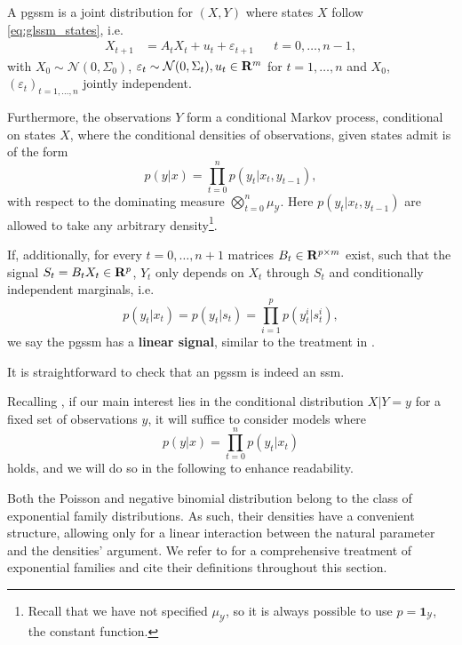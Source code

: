 \begin{definition}
    A \acrfull{pgssm} is a joint distribution for $(X,Y)$ where states $X$ follow \eqref{eq:glssm_states}, i.e. 
    \begin{align*}
        X_{t + 1}  &= A_{t}X_{t} + u_{t} + \varepsilon_{t + 1} &  & t = 0, \dots, n - 1,
    \end{align*}
    with $X_{0} \sim \mathcal N(0, \Sigma_{0})$, $\varepsilon_{t} \sim \mathcal N (0, \Sigma_{t}), u_{t} \in \mathbf R^{m}$ for $t = 1, \dots, n$ and $X_{0}$, $(\varepsilon_{t})_{t = 1, \dots, n}$ jointly independent. 

    Furthermore, the observations $Y$ form a conditional Markov process, conditional on states $X$, where the conditional densities of observations, given states admit is of the form
    $$
    p(y | x) = \prod_{t = 0}^n p(y_{t} | x_{t}, y_{t - 1}),
    $$
    with respect to the dominating measure $\bigotimes_{t = 0}^n\mu_{\mathcal Y}$.
    Here $p(y_{t} | x_{t}, y_{t -1})$ are allowed to take any arbitrary density\footnote{Recall that we have not specified $\mu_{\mathcal Y}$, so it is always possible to use $p = \mathbf 1 _{\mathcal Y}$, the constant function.}.

    If, additionally, for every $t=0, \dots, n+1$ matrices $B_{t} \in \mathbf R^{p \times m}$ exist, such that the signal $S_{t} = B_{t}X_{t} \in \mathbf R^{p}$, $Y_{t}$ only depends on $X_{t}$ through $S_{t}$ and conditionally independent marginals, i.e. 
    $$
        p(y_{t}|x_{t}) = p(y_{t}|s_{t}) = \prod_{i = 1}^p p(y_{t}^i|s_{t}^i),
    $$
    we say the \gls{pgssm} has a \textbf{linear signal}, similar to the treatment in \citep[Part II]{Durbin2012Time}.
\end{definition}

It is straightforward to check that an \gls{pgssm} is indeed an \gls{ssm}. 

\begin{remark}
    Recalling , if our main interest lies in the conditional distribution $X|Y = y$ for a fixed set of observations $y$, it will suffice to consider models where 
    $$
    p(y | x) = \prod_{t = 0}^n p(y_{t} | x_{t})
    $$
    holds, and we will do so in the following to enhance readability.
\end{remark}

Both the Poisson and negative binomial distribution belong to the class of exponential family distributions. As such, their densities have a convenient structure, allowing only for a linear interaction between the natural parameter and the densities' argument. We refer to \citep{Brown1986Fundamentals} for a comprehensive treatment of exponential families and cite their definitions throughout this section.

